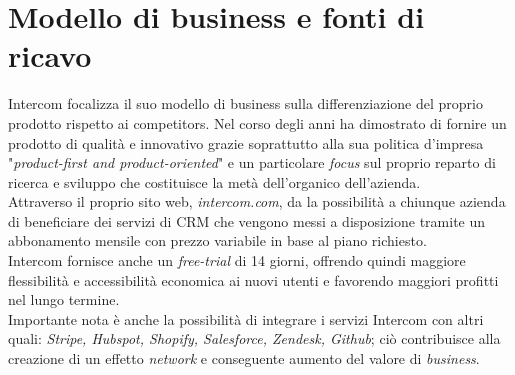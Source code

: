 \documentclass[a4paper, 11pt]{article}
\begin{document}
\section*{Modello di business e fonti di ricavo}
\par
Intercom focalizza il suo modello di business sulla differenziazione del proprio prodotto rispetto ai competitors. Nel corso degli anni ha dimostrato di fornire un prodotto di qualità e innovativo grazie soprattutto alla sua politica d'impresa "\textit{product-first and product-oriented}" e un particolare \textit{focus} sul proprio reparto di ricerca e sviluppo che costituisce la metà dell'organico dell'azienda.\cite{tc3}\\

Attraverso il proprio sito web, \textit{intercom.com}, da la possibilità a chiunque azienda di beneficiare dei servizi di CRM che vengono messi a disposizione tramite un abbonamento mensile con prezzo variabile in base al piano richiesto.\\
Intercom fornisce anche un \textit{free-trial} di 14 giorni, offrendo quindi maggiore flessibilità e accessibilità economica ai nuovi utenti e favorendo maggiori profitti nel lungo termine.\\
Importante nota è anche la possibilità di integrare i servizi Intercom con altri quali: \textit{Stripe, Hubspot, Shopify, Salesforce, Zendesk, Github}; ciò contribuisce alla creazione di un effetto \textit{network} e conseguente aumento del valore di \textit{business}.\\

\newpage
\end{document}
